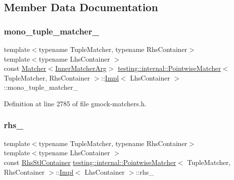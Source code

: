 \subsection{Member Data Documentation}
\mbox{\label{classtesting_1_1internal_1_1PointwiseMatcher_1_1Impl_ac94a851d56fe3f4f900da94cdc08c973}} 
\subsubsection{\texorpdfstring{mono\+\_\+tuple\+\_\+matcher\+\_\+}{mono\_tuple\_matcher\_}}
{\footnotesize\ttfamily template$<$typename Tuple\+Matcher, typename Rhs\+Container$>$ \\
template$<$typename Lhs\+Container $>$ \\
const \hyperlink{classtesting_1_1Matcher}{Matcher}$<$\hyperlink{classtesting_1_1internal_1_1PointwiseMatcher_1_1Impl_aba9d983881cbfbb37724b8b40e863898}{Inner\+Matcher\+Arg}$>$ \hyperlink{classtesting_1_1internal_1_1PointwiseMatcher}{testing\+::internal\+::\+Pointwise\+Matcher}$<$ Tuple\+Matcher, Rhs\+Container $>$\+::\hyperlink{classtesting_1_1internal_1_1PointwiseMatcher_1_1Impl}{Impl}$<$ Lhs\+Container $>$\+::mono\+\_\+tuple\+\_\+matcher\+\_\+\hspace{0.3cm}{\ttfamily [private]}}



Definition at line 2785 of file gmock-\/matchers.\+h.

\mbox{\label{classtesting_1_1internal_1_1PointwiseMatcher_1_1Impl_a7f00c6c50d20c8c274428106b6c8e9ab}} 
\subsubsection{\texorpdfstring{rhs\+\_\+}{rhs\_}}
{\footnotesize\ttfamily template$<$typename Tuple\+Matcher, typename Rhs\+Container$>$ \\
template$<$typename Lhs\+Container $>$ \\
const \hyperlink{classtesting_1_1internal_1_1PointwiseMatcher_aadbaec8c93351f29b103816c2e397edd}{Rhs\+Stl\+Container} \hyperlink{classtesting_1_1internal_1_1PointwiseMatcher}{testing\+::internal\+::\+Pointwise\+Matcher}$<$ Tuple\+Matcher, Rhs\+Container $>$\+::\hyperlink{classtesting_1_1internal_1_1PointwiseMatcher_1_1Impl}{Impl}$<$ Lhs\+Container $>$\+::rhs\+\_\+\hspace{0.3cm}{\ttfamily [private]}}



